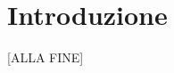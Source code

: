 \documentclass[../Tesi.tex]{subfiles}
\begin{document}
\chapter{Introduzione}
[ALLA FINE]
\end{document}
